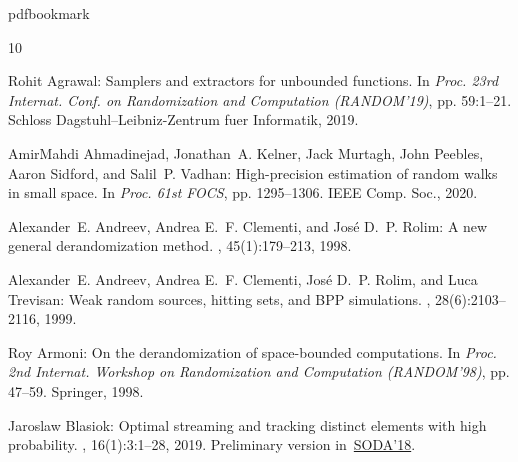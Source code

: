 \documentclass[11pt]{article}
\begin{document}
\newcommand{\prelim}{Preliminary version in\ }\newcommand{\prelims}{Preliminary
  versions in\ }
\providecommand{\bibhead}[1]{}
\expandafter\ifx\csname pdfbookmark\endcsname\relax%
  \providecommand{\tocrefpdfbookmark}{}
\else\providecommand{\tocrefpdfbookmark}{%
   \hypertarget{tocreferences}{}%
   \pdfbookmark[1]{References}{tocreferences}}%
\fi

\tocrefpdfbookmark
\begin{thebibliography}{10}

\bibhead{Agrawal19}
{\sc Rohit Agrawal}: Samplers and extractors for unbounded functions.
\newblock In {\em Proc. 23rd Internat. Conf. on Randomization and Computation
  (RANDOM'19)}, pp. 59:1--21. Schloss Dagstuhl--Leibniz-Zentrum fuer
  Informatik, 2019.

\bibhead{AhmadinejadKeMuPeSiVa19}
{\sc AmirMahdi Ahmadinejad, Jonathan~A. Kelner, Jack Murtagh, John Peebles,
  Aaron Sidford, and Salil~P. Vadhan}: High-precision estimation of random
  walks in small space.
\newblock In {\em Proc. 61st FOCS}, pp. 1295--1306. IEEE Comp. Soc., 2020.

\bibhead{AndreevClRo98}
{\sc Alexander~E. Andreev, Andrea E.~F. Clementi, and Jos{\'e} D.~P. Rolim}: A
  new general derandomization method.
, 45(1):179--213, 1998.
\newblock [\epfmtdoi{10.1145/273865.273933}]

\bibhead{AndreevClRoTr99}
{\sc Alexander~E. Andreev, Andrea E.~F. Clementi, Jos{\'e} D.~P. Rolim, and
  Luca Trevisan}: Weak random sources, hitting sets, and {BPP} simulations.
, 28(6):2103--2116, 1999.
\newblock [\epfmtdoi{10.1137/s0097539797325636}]

\bibhead{Armoni98}
{\sc Roy Armoni}: On the derandomization of space-bounded computations.
\newblock In {\em Proc. 2nd Internat. Workshop on Randomization and Computation
  (RANDOM'98)}, pp. 47--59. Springer, 1998.
\newblock [\epfmtdoi{10.1007/3-540-49543-6\_5}]

\bibhead{Blasiok18}
{\sc Jaroslaw Blasiok}: Optimal streaming and tracking distinct elements with
  high probability.
, 16(1):3:1--28, 2019.
\newblock \prelim \href{https://10.1137/1.9781611975031.156}{SODA'18}.
\newblock [\epfmtdoi{10.1145/3309193}]


\end{thebibliography}
\end{document}
